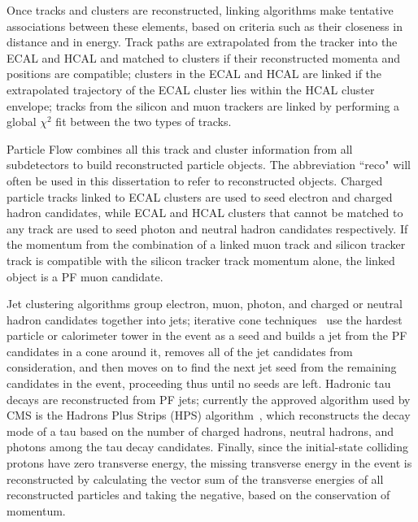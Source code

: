 Once tracks and clusters are reconstructed, linking algorithms make tentative associations between these elements, based on criteria such as their closeness in distance and in energy. Track paths are extrapolated from the tracker into the ECAL and HCAL and matched to clusters if their reconstructed momenta and positions are compatible; clusters in the ECAL and HCAL are linked if the extrapolated trajectory of the ECAL cluster lies within the HCAL cluster envelope; tracks from the silicon and muon trackers are linked by performing a global $\chi^2$ fit between the two types of tracks.

Particle Flow combines all this track and cluster information from all subdetectors to build reconstructed particle objects. The abbreviation ``reco" will often be used in this dissertation to refer to reconstructed objects. Charged particle tracks linked to ECAL clusters are used to seed electron and charged hadron candidates, while ECAL and HCAL clusters that cannot be matched to any track are used to seed photon and neutral hadron candidates respectively. If the momentum from the combination of a linked muon track and silicon tracker track is compatible with the silicon tracker track momentum alone, the linked object is a PF muon candidate.

Jet clustering algorithms group electron, muon, photon, and charged or neutral hadron candidates together into jets; iterative cone techniques~\cite{1126-6708-2008-04-063} use the hardest particle or calorimeter tower in the event as a seed and builds a jet from the PF candidates in a cone around it, removes all of the jet candidates from consideration, and then moves on to find the next jet seed from the remaining candidates in the event, proceeding thus until no seeds are left. Hadronic tau decays are reconstructed from PF jets; currently the approved algorithm used by CMS is the Hadrons Plus Strips (HPS) algorithm~\cite{CMS:2011msa}, which reconstructs the decay mode of a tau based on the number of charged hadrons, neutral hadrons, and photons among the tau decay candidates. Finally, since the initial-state colliding protons have zero transverse energy, the missing transverse energy in the event is reconstructed by calculating the vector sum of the transverse energies of all reconstructed particles and taking the negative, based on the conservation of momentum.

